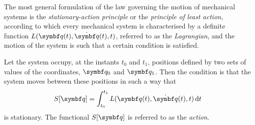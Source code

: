 The most general formulation of the law governing the motion of mechanical systems is the \emph{stationary-action
principle} or the \emph{principle of least action}, according to which every mechanical system is characterised by a
definite function \(L(\vct{q}(t), \dot{\vct{q}}(t), t)\), referred to as the \emph{Lagrangian}, and the motion of the
system is such that a certain condition is satisfied.

Let the system occupy, at the instants \(t_0\) and \(t_1\), positions defined by two sets of values of the coordinates,
\(\vct{q}_0\) and \(\vct{q}_1\). Then the condition is that the system moves between these positions in such a way that
\[
  S[\vct{q}] = \int_{t_0}^{t_1} L(\vct{q}(t), \dot{\vct{q}}(t), t) \diff t
\]
is stationary. The functional \(S[\vct{q}]\) is referred to as the \emph{action}.

\Edc
